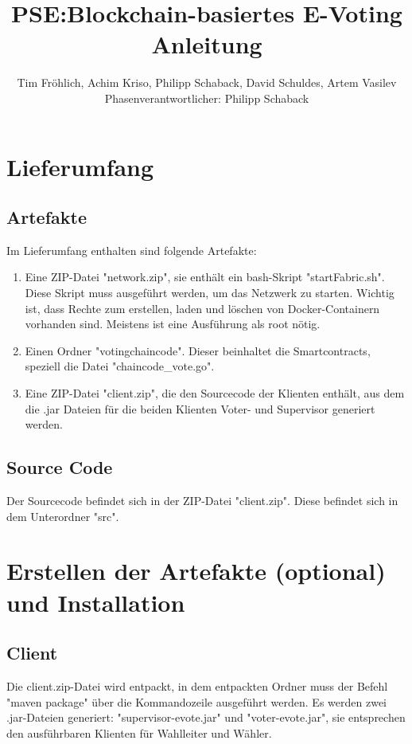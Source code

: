 \documentclass[parskip=full]{scrartcl}
\title{
	PSE:Blockchain-basiertes E-Voting \\
	Anleitung
}
\author{Tim Fröhlich, Achim Kriso, Philipp Schaback, David Schuldes, Artem Vasilev\\ Phasenverantwortlicher: Philipp Schaback}
\begin{document}
	\clearpage
	\maketitle
	\newpage
	
	\tableofcontents
	\newpage
	
	\section{Lieferumfang}
	\subsection{Artefakte}
	Im Lieferumfang enthalten sind folgende Artefakte:
	\begin{enumerate}
		\item Eine ZIP-Datei "network.zip", sie enthält ein bash-Skript "startFabric.sh". Diese Skript muss ausgeführt werden, um das Netzwerk zu starten. Wichtig ist, dass Rechte zum erstellen, laden und löschen von Docker-Containern vorhanden sind. Meistens ist eine Ausführung als root nötig.
		\item Einen Ordner "votingchaincode". Dieser beinhaltet die Smartcontracts, speziell die Datei "chaincode\_vote.go".
		\item Eine ZIP-Datei "client.zip", die den Sourcecode der Klienten enthält, aus dem die .jar Dateien für die beiden Klienten Voter- und Supervisor generiert werden.

	\end{enumerate}

	\subsection{Source Code}
	Der Sourcecode befindet sich in der ZIP-Datei "client.zip". Diese befindet sich in dem Unterordner "src".
	
	\section{Erstellen der Artefakte (optional) und Installation}
	\subsection{Client}
	Die client.zip-Datei wird entpackt, in dem entpackten Ordner muss der Befehl "maven package" über die Kommandozeile ausgeführt werden. Es werden zwei .jar-Dateien generiert: "supervisor-evote.jar" und "voter-evote.jar", sie entsprechen den ausführbaren Klienten für Wahlleiter und Wähler.
\end{document}
